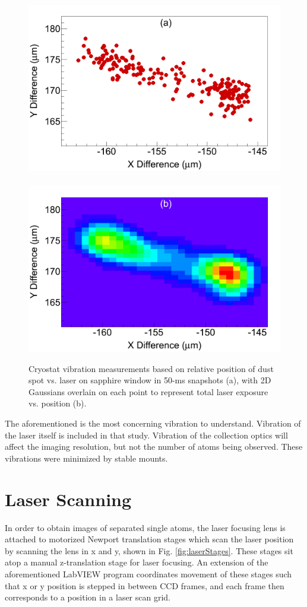 \begin{figure} %
        \centering
                \includegraphics[width=.5\textwidth]{figures/cryovibes_a.png}
                ~
                \includegraphics[width=.5\textwidth]{figures/cryovibes_b.png}
                \caption{Cryostat vibration measurements based on relative position of dust spot vs. laser on sapphire window in 50-ms snapshots (a), with 2D Gaussians overlain on each point to represent total laser exposure vs. position (b).}
\label{fig:cryovibe2D}
\end{figure}

The aforementioned is the most concerning vibration to understand.  Vibration of the laser itself is included in that study.  Vibration of the collection optics will affect the imaging resolution, but not the number of atoms being observed.  These vibrations were minimized by stable mounts.

\section{Laser Scanning}
\label{sec:laserscanning}

In order to obtain images of separated single atoms, the laser focusing lens is attached to motorized Newport translation stages which scan the laser position by scanning the lens in x and y, shown in Fig. \ref{fig:laserStages}.  These stages sit atop a manual z-translation stage for laser focusing.  An extension of the aforementioned LabVIEW program coordinates movement of these stages such that x or y position is stepped in between CCD frames, and each frame then corresponds to a position in a laser scan grid.

